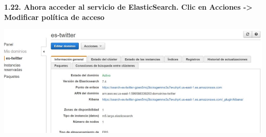 \documentclass{article}
\begin{document}
	
		\textbf{1.22.  Ahora acceder al servicio de ElasticSearch.
Clic en Acciones -> Modificar política de acceso
}

    \begin{center}
		\includegraphics[width=15cm]{./images/25} 
	\end{center}
	
	
	
\end{document}
